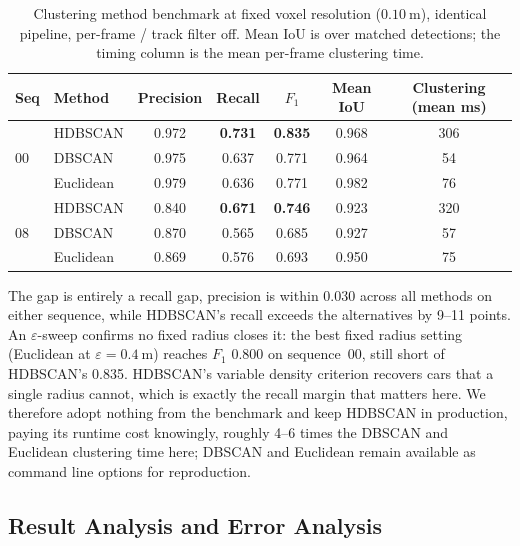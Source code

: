\documentclass[a4paper,12pt]{report}
\begin{document}
\begin{table}[H]
  \centering
  \caption[Clustering method benchmark]{Clustering method benchmark at fixed voxel resolution
    ($\SI{0.10}{\metre}$), identical pipeline, per-frame / track filter off. Mean IoU is over
    matched detections; the timing column is the mean per-frame clustering time.}
  \label{tab:clustering}
  \begin{tabular}{llccccc}
    \toprule
    Seq & Method & Precision & Recall & $F_1$ & Mean IoU & Clustering (mean ms) \\
    \midrule
    \multirow{3}{*}{00}
      & HDBSCAN   & 0.972 & \textbf{0.731} & \textbf{0.835} & 0.968 & 306 \\
      & DBSCAN    & 0.975 & 0.637 & 0.771 & 0.964 & 54 \\
      & Euclidean & 0.979 & 0.636 & 0.771 & 0.982 & 76 \\
    \midrule
    \multirow{3}{*}{08}
      & HDBSCAN   & 0.840 & \textbf{0.671} & \textbf{0.746} & 0.923 & 320 \\
      & DBSCAN    & 0.870 & 0.565 & 0.685 & 0.927 & 57 \\
      & Euclidean & 0.869 & 0.576 & 0.693 & 0.950 & 75 \\
    \bottomrule
  \end{tabular}
\end{table}

The gap is entirely a recall gap, precision is within \num{0.030} across all
methods on either sequence, while HDBSCAN's recall exceeds the alternatives by
\numrange{9}{11} points. An $\varepsilon$-sweep confirms no fixed radius closes
it: the best fixed radius setting (Euclidean at $\varepsilon=\SI{0.4}{\metre}$)
reaches $F_1$ \num{0.800} on sequence~00, still short of HDBSCAN's \num{0.835}.
HDBSCAN's variable density criterion recovers cars that a single radius cannot,
which is exactly the recall margin that matters here. We therefore
adopt nothing from the benchmark and keep HDBSCAN in production, paying
its runtime cost knowingly, roughly \numrange{4}{6} times the DBSCAN and Euclidean clustering
time here; DBSCAN and Euclidean remain available as command line options for reproduction.

\subsection{Result Analysis and Error Analysis}
\label{sec:recall-analysis}
\end{document}
